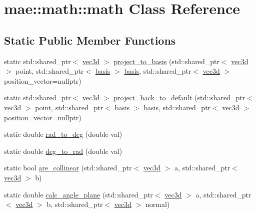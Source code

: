 \hypertarget{classmae_1_1math_1_1math}{\section{mae\-:\-:math\-:\-:math Class Reference}
\label{classmae_1_1math_1_1math}
}
\subsection*{Static Public Member Functions}
\begin{DoxyCompactItemize}
\item 
static std\-::shared\-\_\-ptr$<$ \hyperlink{classmae_1_1math_1_1vec3d}{vec3d} $>$ \hyperlink{classmae_1_1math_1_1math_a31f87c06fdc0ba609e3dd96154fdd9f2}{project\-\_\-to\-\_\-basis} (std\-::shared\-\_\-ptr$<$ \hyperlink{classmae_1_1math_1_1vec3d}{vec3d} $>$ point, std\-::shared\-\_\-ptr$<$ \hyperlink{classmae_1_1math_1_1basis}{basis} $>$ \hyperlink{classmae_1_1math_1_1basis}{basis}, std\-::shared\-\_\-ptr$<$ \hyperlink{classmae_1_1math_1_1vec3d}{vec3d} $>$ position\-\_\-vector=nullptr)
\item 
static std\-::shared\-\_\-ptr$<$ \hyperlink{classmae_1_1math_1_1vec3d}{vec3d} $>$ \hyperlink{classmae_1_1math_1_1math_a889e4a757fe5237fb55995c013224da9}{project\-\_\-back\-\_\-to\-\_\-default} (std\-::shared\-\_\-ptr$<$ \hyperlink{classmae_1_1math_1_1vec3d}{vec3d} $>$ point, std\-::shared\-\_\-ptr$<$ \hyperlink{classmae_1_1math_1_1basis}{basis} $>$ \hyperlink{classmae_1_1math_1_1basis}{basis}, std\-::shared\-\_\-ptr$<$ \hyperlink{classmae_1_1math_1_1vec3d}{vec3d} $>$ position\-\_\-vector=nullptr)
\item 
static double \hyperlink{classmae_1_1math_1_1math_a37ab34ed5a6b7b7253dc7657e2b3a5ea}{rad\-\_\-to\-\_\-deg} (double val)
\item 
static double \hyperlink{classmae_1_1math_1_1math_a87dfc60d31b86942b9147377bef659f5}{deg\-\_\-to\-\_\-rad} (double val)
\item 
static bool \hyperlink{classmae_1_1math_1_1math_a5f5bfb261b612865655ec615d1927b43}{are\-\_\-collinear} (std\-::shared\-\_\-ptr$<$ \hyperlink{classmae_1_1math_1_1vec3d}{vec3d} $>$ a, std\-::shared\-\_\-ptr$<$ \hyperlink{classmae_1_1math_1_1vec3d}{vec3d} $>$ b)
\item 
static double \hyperlink{classmae_1_1math_1_1math_a056dea5a5dd1f865e9ebc5241450b817}{calc\-\_\-angle\-\_\-plane} (std\-::shared\-\_\-ptr$<$ \hyperlink{classmae_1_1math_1_1vec3d}{vec3d} $>$ a, std\-::shared\-\_\-ptr$<$ \hyperlink{classmae_1_1math_1_1vec3d}{vec3d} $>$ b, std\-::shared\-\_\-ptr$<$ \hyperlink{classmae_1_1math_1_1vec3d}{vec3d} $>$ normal)

\end{DoxyCompactItemize}
